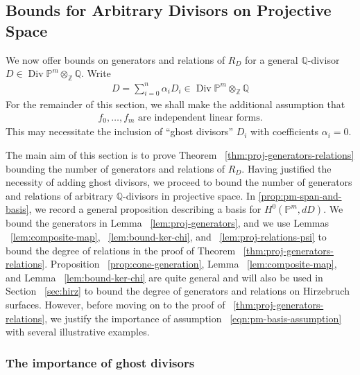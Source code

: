 \documentclass{amsart}
\theoremstyle{plain}
\theoremstyle{definition}
\theoremstyle{remark}
\numberwithin{equation}{section}
\newcommand\ssec{\subsection}
\newcommand\sssec{\subsubsection}
\newcommand\bq{{\mathbb Q}}
\newcommand\bp{{\mathbb P}}
\newcommand\bz{{\mathbb Z}}
\DeclareMathOperator\di{Div}
\begin{document}
\ssec{Bounds for Arbitrary Divisors on Projective Space}
\label{ssec:arbitrary-projective}
We now offer bounds on generators and relations of $R_D$ for a general $\bq$-divisor $D \in \di \bp^m \otimes_\bz \bq$.
Write \begin{align*}
	D = \sum_{i=0}^{n}\alpha_i D_i \in \di \bp^m \otimes_\bz \bq
\end{align*}
For the remainder of this section, we shall make the additional assumption that 
\begin{align} \label{eqn:pm-basis-assumption} f_0, \ldots, f_{m}
	\text{ are independent linear forms.} \end{align}
This may necessitate the inclusion of ``ghost divisors'' $D_i$ with coefficients $\alpha_i = 0$. 

The main aim of this section is to prove Theorem
~\ref{thm:proj-generators-relations} bounding the number of generators and
relations of $R_D$. 
Having justified the necessity of adding ghost divisors, we proceed to bound the
number of generators and relations of arbitrary $\bq$-divisors in 
projective space. 
In \autoref{prop:pm-span-and-basis}, we record a general proposition describing
a basis for $H^0(\bp^m, dD)$.
We bound the generators in Lemma ~\ref{lem:proj-generators}, and we use Lemmas ~\ref{lem:composite-map}, ~\ref{lem:bound-ker-chi}, and ~\ref{lem:proj-relations-psi} to bound the 
degree of relations in the proof of Theorem ~\ref{thm:proj-generators-relations}. Proposition ~\ref{prop:cone-generation}, Lemma ~\ref{lem:composite-map}, and Lemma ~\ref{lem:bound-ker-chi} are quite 
general and will also be used in Section ~\ref{sec:hirz} to bound the 
degree of generators and relations on Hirzebruch surfaces.
However, before moving on to the proof of ~\ref{thm:proj-generators-relations}, we justify the importance of assumption
~\eqref{eqn:pm-basis-assumption} with several illustrative examples.
\sssec*{The importance of ghost divisors}
\label{sssec:ghost-divisors}
\end{document}
